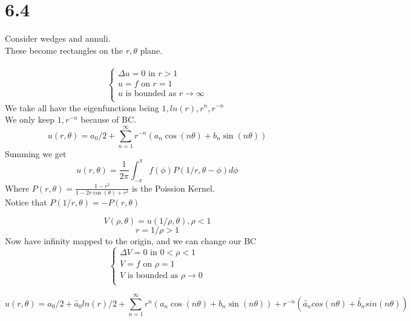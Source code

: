 \documentclass[answers, 12pts,addpoints]{exam}
\begin{document}
\section*{6.4 }
Consider wedges and annuli.\\
These become rectangles on the $r, \theta$ plane.\\\\
$$ \begin{cases}
    \Delta u = 0 \text{ in }  r>1\\
    u = f \text{ on } r = 1\\
    u \text{ is bounded as } r \to \infty\\
\end{cases}$$
We take all have the eigenfunctions being $1, ln(r), r^n, r^{-n}$\\
We only keep $1, r^{-n}$ because of BC. 
$$ u(r,\theta) = a_0/2 + \sum_{n=1}^\infty r^{-n} (a_n \cos(n\theta) + b_n \sin(n\theta))$$
Summing we get 
$$ u(r,\theta) = \frac{1}{2\pi} \int_{-\pi}^{\pi} f(\phi) P(1/r, \theta - \phi) d\phi$$
Where $P(r,\theta) = \frac{1 - r^2}{1 - 2r\cos(\theta) + r^2}$ is the Poission Kernel.\\
Notice that $P(1/r, \theta ) = -P(r, \theta)$\\
\begin{example}
    $$V(\rho, \theta) = u(1/\rho, \theta), \rho < 1$$
    $$r = 1/\rho > 1$$
    Now have infinity mapped to the origin, and we can change our BC
    $$\begin{cases}
        \Delta V = 0 \text{ in } 0 < \rho < 1\\
        V = f \text{ on } \rho = 1\\
        V \text{ is bounded as } \rho \to 0\\
    \end{cases}$$
\end{example}
$$ u(r, \theta) = a_0/2 + \tilde{a_0}ln(r)/2 + \sum_{n=1}^\infty r^{n} (a_n \cos(n\theta) + b_n \sin(n\theta)) + r^{-n}(\tilde{a_n}cos(n\theta) + \tilde{b_n}sin(n\theta))$$
\end{document}
